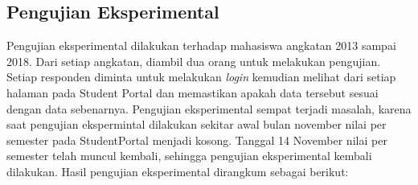 \subsection{Pengujian Eksperimental}
Pengujian eksperimental dilakukan terhadap mahasiswa angkatan 2013 sampai 2018. Dari setiap angkatan, diambil dua orang untuk melakukan pengujian. Setiap responden diminta untuk melakukan \textit{login} kemudian melihat dari setiap halaman pada Student Portal dan memastikan apakah data tersebut sesuai dengan data sebenarnya. Pengujian eksperimental sempat terjadi masalah, karena saat pengujian ekspermintal dilakukan sekitar awal bulan november nilai per semester pada StudentPortal menjadi kosong. Tanggal 14 November nilai per semester telah muncul kembali, sehingga pengujian eksperimental kembali dilakukan.
Hasil pengujian eksperimental dirangkum sebagai berikut:
